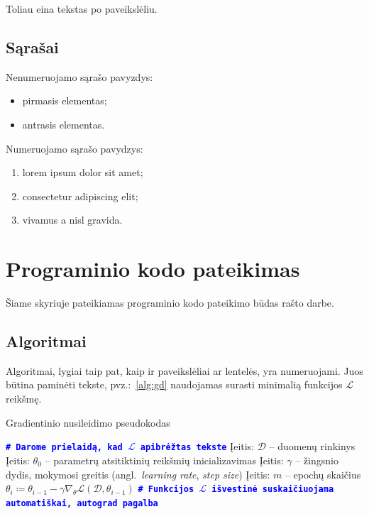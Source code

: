 \documentclass[]{VUMIFTemplateClass}
\begin{document}
Toliau eina tekstas po paveikslėliu.

\subsection{Sąrašai}

Nenumeruojamo sąrašo pavyzdys:
\begin{itemize}
    \item pirmasis elementas;
    \item antrasis elementas.
\end{itemize}

Numeruojamo sąrašo pavydzys:
\begin{enumerate}
    \item lorem ipsum dolor sit amet;
    \item consectetur adipiscing elit;
    \item vivamus a nisl gravida.
\end{enumerate}


\section{Programinio kodo pateikimas}
Šiame skyriuje pateikiamas programinio kodo pateikimo būdas rašto darbe.

\subsection{Algoritmai}

Algoritmai, lygiai taip pat, kaip ir paveikslėliai ar lentelės, yra numeruojami.
Juos būtina paminėti tekste, pvz.:~\ref{alg:gd} naudojamas surasti minimalią funkcijos $\mathcal{L}$ reikšmę.

\begin{algorithm}[h]
\caption{Gradientinio nusileidimo pseudokodas}\label{alg:gd}
\begin{algorithmic}[1]
    \STATE \textcolor{blue}{\texttt{\textbf{\# Darome prielaidą, kad $\mathcal{L}$ apibrėžtas tekste}}}
        \STATE Įeitis: $\mathcal{D}$ -- duomenų rinkinys
        \STATE Įeitis: $\theta_0$ -- parametrų atsitiktinių reikšmių inicializavimas
        \STATE Įeitis: $\gamma$ -- žingsnio dydis, mokymosi greitis (angl.~\textit{learning rate}, \textit{step size})
        \STATE Įeitis: $m$ -- epochų skaičius
            \STATE $\theta_i \coloneq \theta_{i-1} - \gamma \nabla_\theta \mathcal{L}(\mathcal{D}, \theta_{i-1})$
            \STATE \textcolor{blue}{\texttt{\textbf{\# Funkcijos $\mathcal{L}$ išvestinė suskaičiuojama automatiškai, autograd pagalba}}}
        \ENDFOR
\end{algorithmic}
\end{algorithm}
\end{document}
